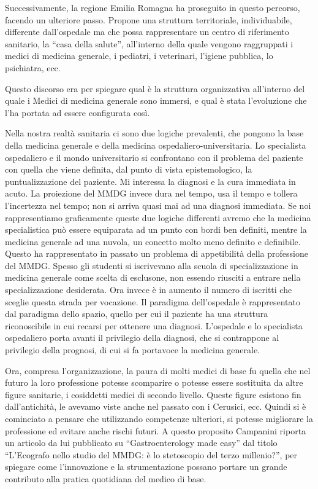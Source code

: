 \documentclass[]{article}
\begin{document}
Successivamente, la regione Emilia Romagna ha proseguito in questo
percorso, facendo un ulteriore passo. Propone una struttura
territoriale, individuabile, differente dall'ospedale ma che possa
rappresentare un centro di riferimento sanitario, la ``casa della
salute'', all'interno della quale vengono raggruppati i medici di
medicina generale, i pediatri, i veterinari, l'igiene pubblica, lo
psichiatra, ecc.

Questo discorso era per spiegare qual è la struttura organizzativa
all'interno del quale i Medici di medicina generale sono immersi, e qual
è stata l'evoluzione che l'ha portata ad essere configurata così.

Nella nostra realtà sanitaria ci sono due logiche prevalenti, che
pongono la base della medicina generale e della medicina
ospedaliero-universitaria. Lo specialista ospedaliero e il mondo
universitario si confrontano con il problema del paziente con quella che
viene definita, dal punto di vista epistemologico, la puntualizzazione
del paziente. Mi interessa la diagnosi e la cura immediata in acuto. La
proiezione del MMDG invece dura nel tempo, usa il tempo e tollera
l'incertezza nel tempo; non si arriva quasi mai ad una diagnosi
immediata. Se noi rappresentiamo graficamente queste due logiche
differenti avremo che la medicina specialistica può essere equiparata ad
un punto con bordi ben definiti, mentre la medicina generale ad una
nuvola, un concetto molto meno definito e definibile. Questo ha
rappresentato in passato un problema di appetibilità della professione
del MMDG. Spesso gli studenti si iscrivevano alla scuola di
specializzazione in medicina generale come scelta di esclusone, non
essendo riusciti a entrare nella specializzazione desiderata. Ora invece
è in aumento il numero di iscritti che sceglie questa strada per
vocazione. Il paradigma dell'ospedale è rappresentato dal paradigma
dello spazio, quello per cui il paziente ha una struttura riconoscibile
in cui recarsi per ottenere una diagnosi. L'ospedale e lo specialista
ospedaliero porta avanti il privilegio della diagnosi, che si
contrappone al privilegio della prognosi, di cui si fa portavoce la
medicina generale.

Ora, compresa l'organizzazione, la paura di molti medici di base fu
quella che nel futuro la loro professione potesse scomparire o potesse
essere sostituita da altre figure sanitarie, i cosiddetti medici di
secondo livello. Queste figure esistono fin dall'antichità, le avevamo
viste anche nel passato con i Cerusici, ecc. Quindi si è cominciato a
pensare che utilizzando competenze ulteriori, si potesse migliorare la
professione ed evitare anche rischi futuri. A questo proposito Campanini
riporta un articolo da lui pubblicato su ``Gastroenterology made easy''
dal titolo ``L'Ecografo nello studio del MMDG: è lo stetoscopio del
terzo millenio?'', per spiegare come l'innovazione e la strumentazione
possano portare un grande contributo alla pratica quotidiana del medico
di base.
\end{document}
